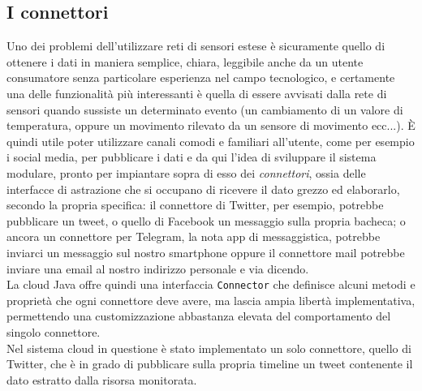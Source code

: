 \subsection{I connettori}
Uno dei problemi dell'utilizzare reti di sensori estese è sicuramente quello di ottenere i dati in maniera semplice, chiara, leggibile anche da un utente consumatore senza particolare esperienza nel campo tecnologico, e certamente una delle funzionalità più interessanti è quella di essere avvisati dalla rete di sensori quando sussiste un determinato evento (un cambiamento di un valore di temperatura, oppure un movimento rilevato da un sensore di movimento ecc...). È quindi utile poter utilizzare canali comodi e familiari all'utente, come per esempio i social media, per pubblicare i dati e da qui l'idea di sviluppare il sistema modulare, pronto per impiantare sopra di esso dei \textit{connettori}, ossia delle interfacce di astrazione che si occupano di ricevere il dato grezzo ed elaborarlo, secondo la propria specifica: il connettore di Twitter, per esempio, potrebbe pubblicare un tweet, o quello di Facebook un messaggio sulla propria bacheca; o ancora un connettore per Telegram, la nota app di messaggistica, potrebbe inviarci un messaggio sul nostro smartphone oppure il connettore mail potrebbe inviare una email al nostro indirizzo personale e via dicendo.
\\La cloud Java offre quindi una interfaccia {\tt Connector} che definisce alcuni metodi e proprietà che ogni connettore deve avere, ma lascia ampia libertà implementativa, permettendo una customizzazione abbastanza elevata del comportamento del singolo connettore.
\\Nel sistema cloud in questione è stato implementato un solo connettore, quello di Twitter, che è in grado di pubblicare sulla propria timeline un tweet contenente il dato estratto dalla risorsa monitorata.

